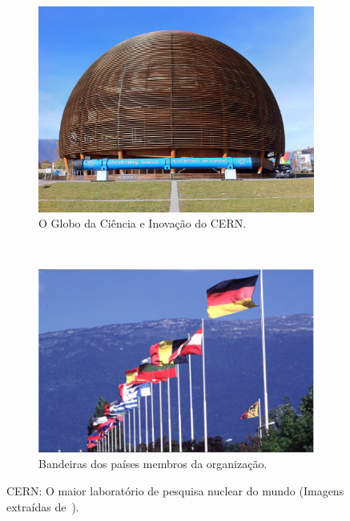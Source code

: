\begin{figure}[htpb!]
        \centering
        \begin{subfigure}[b]{0.45\textwidth}
                \centering
                \includegraphics[trim=0cm 4cm 0cm 3cm, clip=true,width=\textwidth]{images/innovation_globe.jpg}
                \caption{ O Globo da Ciência e Inovação do CERN.}
                \label{fig:scienceglobe}
        \end{subfigure}%
        ~
        \begin{subfigure}[b]{0.45\textwidth}
                \centering
                \includegraphics[width=\textwidth]{images/cern_flags.jpg}
                \caption{ Bandeiras dos países membros da organização.}
                \label{fig:cernflags}
        \end{subfigure}
        \caption[Fotografias de marcos no CERN.]{CERN: O maior laboratório de
        pesquisa nuclear do
        mundo (Imagens extraídas de~\cite{ref:cern_www}).}\label{fig:cern1}
\end{figure}

